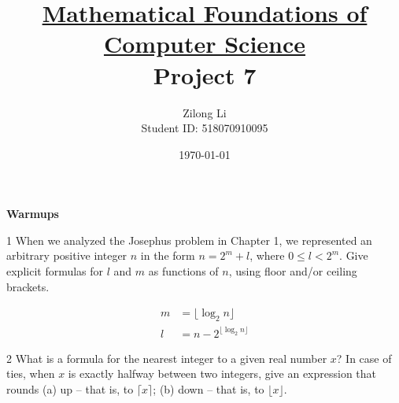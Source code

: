 \documentclass[a4paper,12pt]{article}
\title{\small \underline{Mathematical Foundations of Computer Science}\\\Large Project 7}
\author{Zilong Li\\\small Student ID: 518070910095}
\date{\today}
\makeatletter
\newtheorem*{solution}{Solution}
\theoremstyle{definition}
\renewenvironment{solution}[1][Solution] {\par\pushQED{\qed}\normalfont\topsep6\p@\@plus6\p@\relax\trivlist\item[\hskip\labelsep\bfseries#1\@addpunct{.}]\ignorespaces}{\popQED\endtrivlist\@endpefalse} \makeatother
\newenvironment{problems}{\begin{list}{}{\renewcommand{\makelabel}[1]{\textbf{##1}\hfil}}}{\end{list}}
\makeatother
\begin{document}
\maketitle

\noindent\textbf{Warmups}

\begin{problems}
    \item[1] When we analyzed the Josephus problem in Chapter 1, we represented an arbitrary positive integer $n$ in the form $n=2^m+l$, where $0\leq l < 2^m$. Give explicit formulas for $l$ and $m$ as functions of $n$, using floor and/or ceiling brackets.
    \begin{solution}
        \begin{align*}
            m &= \lfloor \log_2 n \rfloor\\
            l &= n - 2^{\lfloor \log_2 n\rfloor}
        \end{align*}  
    \end{solution} 
    
    \item[2] What is a formula for the nearest integer to a given real number $x$? In case of ties, when $x$ is exactly halfway between two integers, give an expression that rounds (a) up -- that is, to $\lceil x\rceil$; (b) down -- that is, to $\lfloor x\rfloor$.
    

\end{problems}
\end{document}
